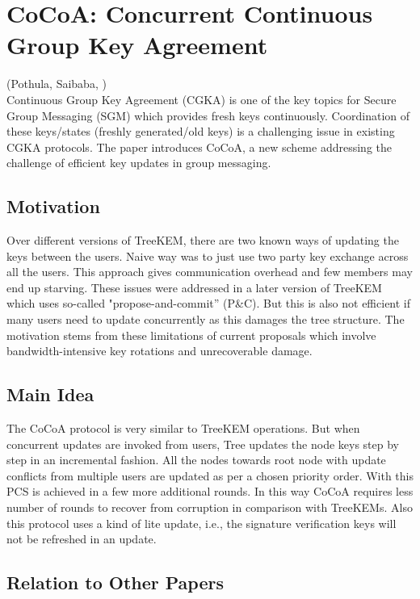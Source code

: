 \section{CoCoA: Concurrent Continuous Group Key Agreement}
\label{sec:EC:AANKPPW22}
(Pothula, Saibaba, \cite{EC:AANKPPW22,EPRINT:AANKPPW22})\\

Continuous Group Key Agreement (CGKA) is one of the key topics for Secure Group Messaging (SGM) which provides fresh keys continuously. Coordination of these keys/states (freshly generated/old keys) is a challenging issue in existing CGKA protocols. The paper introduces CoCoA, a new scheme addressing the challenge of efficient key updates in group messaging.

\subsection{Motivation}

Over different versions of TreeKEM, there are two known ways of updating the keys between the users. Naive way was to just use two party key exchange across all the users. This approach gives communication overhead and few members may end up starving. These issues were addressed in a later version of TreeKEM which uses so-called "propose-and-commit” (P\&C). But this is also not efficient if many users need to update concurrently as this damages the tree structure. The motivation stems from these limitations of current proposals which involve bandwidth-intensive key rotations and unrecoverable damage.

\subsection{Main Idea}

The CoCoA protocol is very similar to TreeKEM operations. But when concurrent updates are invoked from users, Tree updates the node keys step by step in an incremental fashion. All the nodes towards root node with update conflicts from multiple users are updated as per a chosen priority order. With this PCS is achieved in a few more additional rounds. In this way CoCoA requires less number of rounds to recover from corruption in comparison with TreeKEMs. Also this protocol uses a kind of lite update, i.e., the signature verification keys will not be refreshed in an update.

\subsection{Relation to Other Papers}

